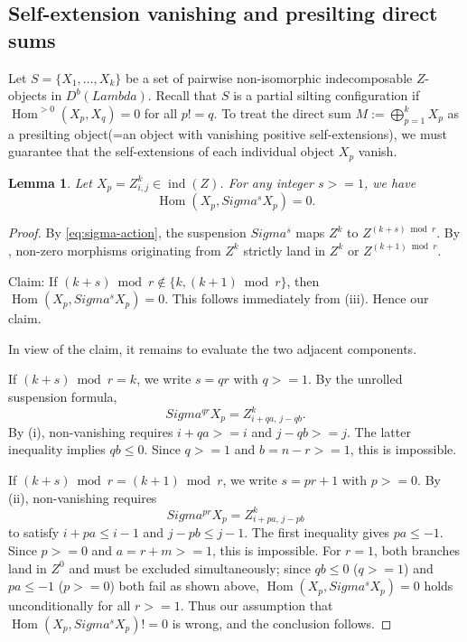 \documentclass[11pt, a4paper]{article}
\newtheorem{lemma}[theorem]{Lemma}
\theoremstyle{definition}
\def\Lambda{Lambda}%
\def\Sigma{Sigma}%
\def\ge{>=}%
\def\neq{!=}%
\def\mathcal#1{#1}%
\def\Db{D^b}%
\newcommand{\Db}{\mathcal{D}^b}
\begin{document}
\subsection{Self-extension vanishing and presilting direct sums}
\label{subsec:bound-presilting}

Let $S = \{X_1, \ldots, X_k\}$ be a set of pairwise non-isomorphic indecomposable $\mathcal Z$-objects in $\Db(\Lambda)$. Recall that $S$ is a partial silting configuration if $\operatorname{Hom}^{>0}(X_p, X_q) = 0$ for all $p \neq q$. To treat the direct sum $M := \bigoplus_{p=1}^k X_p$ as a presilting object(=an object with vanishing positive self-extensions), we must guarantee that the self-extensions of each individual object $X_p$ vanish.

\begin{lemma}\label{lem:self-hom-vanishing}
Let $X_p = Z_{i,j}^k \in \operatorname{ind}(\mathcal Z)$. For any integer $s \ge 1$, we have
\[
  \operatorname{Hom}(X_p, \Sigma^s X_p) = 0.
\]
\end{lemma}

\begin{proof}
By \eqref{eq:sigma-action}, the suspension $\Sigma^s$ maps $\mathcal Z^k$ to $\mathcal Z^{(k+s)\bmod r}$. By , non-zero morphisms originating from $\mathcal Z^k$ strictly land in $\mathcal Z^k$ or $\mathcal Z^{(k+1)\bmod r}$.

Claim: If $(k+s) \bmod r \notin \{k, (k+1) \bmod r\}$, then $\operatorname{Hom}(X_p, \Sigma^s X_p) = 0$.
This follows immediately from (iii). Hence our claim.

In view of the claim, it remains to evaluate the two adjacent components.

If $(k+s) \bmod r = k$, we write $s = q r$ with $q \ge 1$. By the unrolled suspension formula,
\[
  \Sigma^{qr} X_p = Z_{i+qa,\, j-qb}^k.
\]
By (i), non-vanishing requires $i+qa \ge i$ and $j-qb \ge j$. The latter inequality implies $qb \le 0$. Since $q \ge 1$ and $b = n-r \ge 1$, this is impossible.

If $(k+s) \bmod r = (k+1) \bmod r$, we write $s = p r + 1$ with $p \ge 0$. By (ii), non-vanishing requires
\[
  \Sigma^{pr} X_p = Z_{i+pa,\, j-pb}^k
\]
to satisfy $i+pa \le i-1$ and $j-pb \le j-1$. The first inequality gives $pa \le -1$. Since $p \ge 0$ and $a = r+m \ge 1$, this is impossible. For $r=1$, both branches land in $\mathcal{Z}^0$ and must be excluded simultaneously; since $qb \le 0$ ($q \ge 1$) and $pa \le -1$ ($p \ge 0$) both fail as shown above, $\operatorname{Hom}(X_p, \Sigma^s X_p) = 0$ holds unconditionally for all $r \ge 1$. Thus our assumption that $\operatorname{Hom}(X_p, \Sigma^s X_p) \neq 0$ is wrong, and the conclusion follows.
\end{proof}
\end{document}
